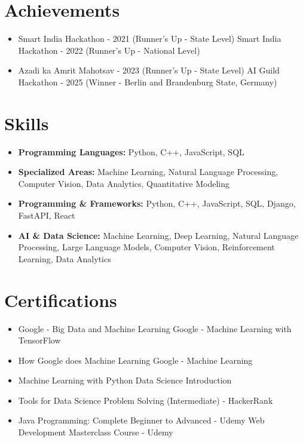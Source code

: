 \documentclass[a4paper,10pt]{article}
\begin{document}
\section*{Achievements}
\begin{itemize}
\item Smart India Hackathon - 2021 (Runner's Up - State Level) \hfill Smart India Hackathon - 2022 (Runner's Up - National Level)
\item Azadi ka Amrit Mahotsav - 2023 (Runner's Up - State Level) \hfill AI Guild Hackathon - 2025 (Winner - Berlin and Brandenburg State, Germany)
\end{itemize}

\section*{Skills}
\begin{itemize}
  \item \textbf{Programming Languages:} Python, C++, JavaScript, SQL
  \item \textbf{Specialized Areas:} Machine Learning, Natural Language Processing, Computer Vision, Data Analytics, Quantitative Modeling
  \item \textbf{Programming \& Frameworks:} Python, C++, JavaScript, SQL, Django, FastAPI, React
  \item \textbf{AI \& Data Science:} Machine Learning, Deep Learning, Natural Language Processing, Large Language Models, Computer Vision, Reinforcement Learning, Data Analytics
\end{itemize}

\section*{Certifications}
\begin{itemize}
\item Google - Big Data and Machine Learning \hfill Google - Machine Learning with TensorFlow
\item How Google does Machine Learning \hfill Google - Machine Learning
\item Machine Learning with Python \hfill Data Science Introduction
\item Tools for Data Science \hfill Problem Solving (Intermediate) - HackerRank
\item Java Programming: Complete Beginner to Advanced - Udemy \hfill Web Development Masterclass Course - Udemy
\end{itemize}
\end{document}
